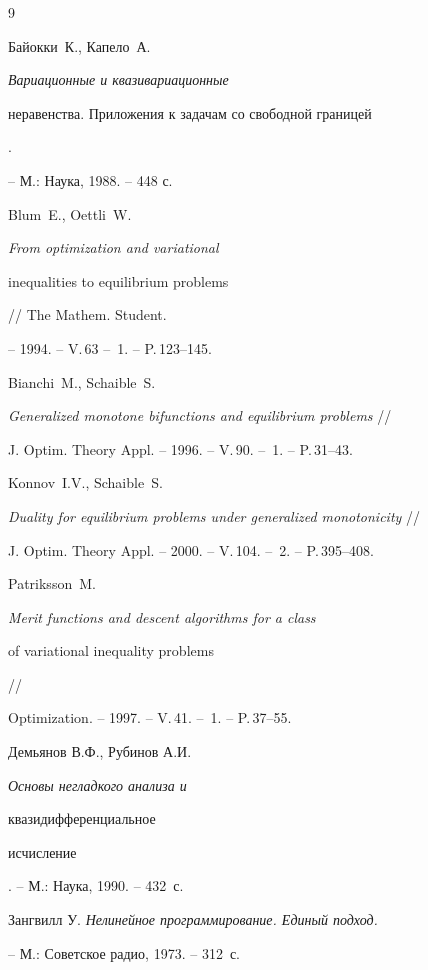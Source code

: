 \begin{thebibliography}{9}







Байокки~К., Капело~А. {\it Вариационные и квазивариационные 


неравенства. Приложения к задачам со свободной границей}. 


-- М.: Наука, 1988. -- 448 с.







Blum~E., Oettli~W. {\it From optimization  and variational


inequalities to equilibrium problems} // The Mathem. Student.


-- 1994. -- V.\,63 -- \No\,1. -- P.\,123--145.







Bianchi~M., Schaible~S. 


{\it Generalized monotone bifunctions and equilibrium problems} //


J. Optim. Theory Appl. -- 1996. -- V.\,90. -- \No\,1. -- P.\,31--43.







Konnov~I.V., Schaible~S.


{\it Duality for equilibrium problems under generalized monotonicity} //


J. Optim. Theory Appl. -- 2000. -- V.\,104. -- \No\,2. -- P.\,395--408.







Patriksson~M. {\it  Merit functions and descent algorithms for a class


of variational inequality problems} //


Optimization. -- 1997. -- V.\,41. -- \No\,1. -- P.\,37--55.







Демьянов В.Ф., Рубинов А.И. {\it Основы негладкого анализа и 


квазидифференциальное 


исчисление}. -- М.: Наука, 1990. -- 432~с.







Зангвилл У. {\it Нелинейное программирование. Единый подход.} 


-- М.: Советское радио, 1973. -- 312~с.





\end{thebibliography}





